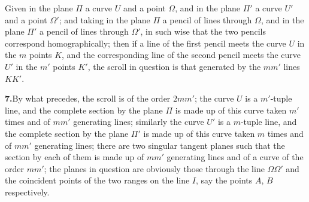\documentclass[11pt,a4paper]{article}
\begin{document}
Given in the plane $\Pi$ a curve $U$ and a point $\Omega$, and in the plane
$\Pi'$ a curve $U'$ and a point $\Omega'$; and taking in the plane $\Pi$ a
pencil of lines through $\Omega$, and in the plane $\Pi'$ a pencil of lines
through $\Omega'$, in such wise that the two pencils correspond
homographically; then if a line of the first pencil meets the curve $U$ in the
$m$ points $K$, and the corresponding line of the second pencil meets the
curve $U'$ in the $m'$ points $K'$, the scroll in question is that generated
by the $m m'$ lines $KK'$.

\textbf{7.}\quad By what precedes, the scroll is of the order $2 m m'$; the
curve $U$ is a $m'$-tuple line, and the complete section by the plane $\Pi$ is
made up of this curve taken $m'$ times and of $m m'$ generating lines;
similarly the curve $U'$ is a $m$-tuple line, and the complete section by the
plane $\Pi'$ is made up of this curve taken $m$ times and of $m m'$ generating
lines; there are two singular tangent planes such that the section by each of
them is made up of $m m'$ generating lines and of a curve of the order $m m'$;
the planes in question are obviously those through the line $\Omega\Omega'$
and the coincident points of the two ranges on the line $I$, say the points
$A$, $B$ respectively.
\end{document}
